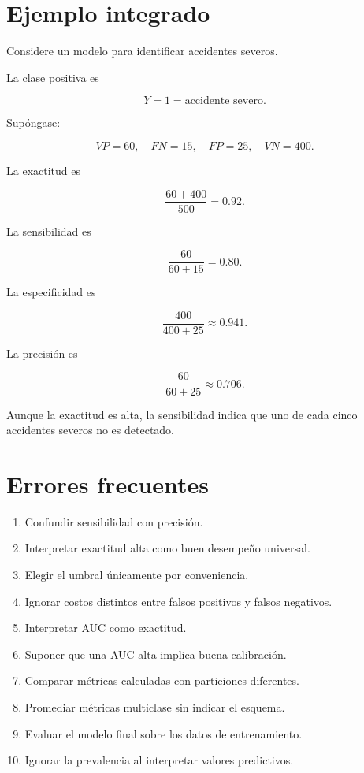 \documentclass[
  spanish,
  10.5pt,
  letterpaper,
  DIV=11,
  numbers=noendperiod,
  oneside,
  open=any]{scrreprt}
\providecommand{\tightlist}{%
  \setlength{\itemsep}{0pt}\setlength{\parskip}{0pt}}
\theoremstyle{definition}
\theoremstyle{definition}
\theoremstyle{plain}
\theoremstyle{remark}
\begin{document}
\section*{Ejemplo integrado}\label{ejemplo-integrado-3}


Considere un modelo para identificar accidentes severos.

La clase positiva es

\[
Y=1
=
\text{accidente severo}.
\]

Supóngase:

\[
VP=60,
\quad
FN=15,
\quad
FP=25,
\quad
VN=400.
\]

La exactitud es

\[
\frac{60+400}{500}
=
0.92.
\]

La sensibilidad es

\[
\frac{60}{60+15}
=
0.80.
\]

La especificidad es

\[
\frac{400}{400+25}
\approx 0.941.
\]

La precisión es

\[
\frac{60}{60+25}
\approx 0.706.
\]

Aunque la exactitud es alta, la sensibilidad indica que uno de cada
cinco accidentes severos no es detectado.

\section*{Errores frecuentes}\label{errores-frecuentes-5}


\begin{enumerate}
\def\labelenumi{\arabic{enumi}.}
\tightlist
\item
  Confundir sensibilidad con precisión.
\item
  Interpretar exactitud alta como buen desempeño universal.
\item
  Elegir el umbral únicamente por conveniencia.
\item
  Ignorar costos distintos entre falsos positivos y falsos negativos.
\item
  Interpretar AUC como exactitud.
\item
  Suponer que una AUC alta implica buena calibración.
\item
  Comparar métricas calculadas con particiones diferentes.
\item
  Promediar métricas multiclase sin indicar el esquema.
\item
  Evaluar el modelo final sobre los datos de entrenamiento.
\item
  Ignorar la prevalencia al interpretar valores predictivos.
\end{enumerate}
\end{document}
